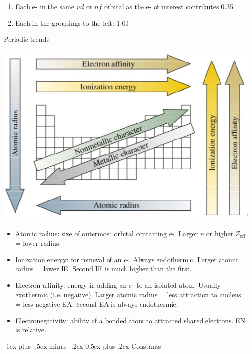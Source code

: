 \documentclass[10pt,landscape]{article}
\makeatletter
\renewcommand{\section}{\@startsection{section}{1}{0mm}%
                                {-1ex plus -.5ex minus -.2ex}%
                                {0.5ex plus .2ex}%
                                {\normalfont\large\bfseries}}
\makeatother
\begin{document}
\begin{multicols}{3}
\begin{enumerate}
	\begin{enumerate}
	\item Each e- in the same $nd$ or $nf$  orbital as the e- of interest contributes 0.35
	\item Each in the groupings to the left: 1.00
	\end{enumerate}

\end{enumerate}

Periodic trends

\begin{center}
\includegraphics[width=\linewidth]{./chm2311/periodic-table-trends.png}
\end{center}
 
\begin{itemize} 
\item Atomic radius: size of outermost orbital containing e-. Larger $n$ or higher $Z_\text{eff}$ = lower radius.
\item Ionization energy: for removal of an e-. Always endothermic. Larger atomic radius  = lower IE.  Second IE is much higher than the first.
\item Electron affinity: energy in adding an e- to an isolated atom. Usually exothermic (i.e. negative). Larger atomic radius = less attraction to nucleus = less-negative EA. Second EA is always endothermic. 
\item Electronegativity: ability of a bonded atom to attracted shared electrons. EN is relative.
\end{itemize}

\hrulefill


\section{Constants}


\end{multicols}
\end{document}
